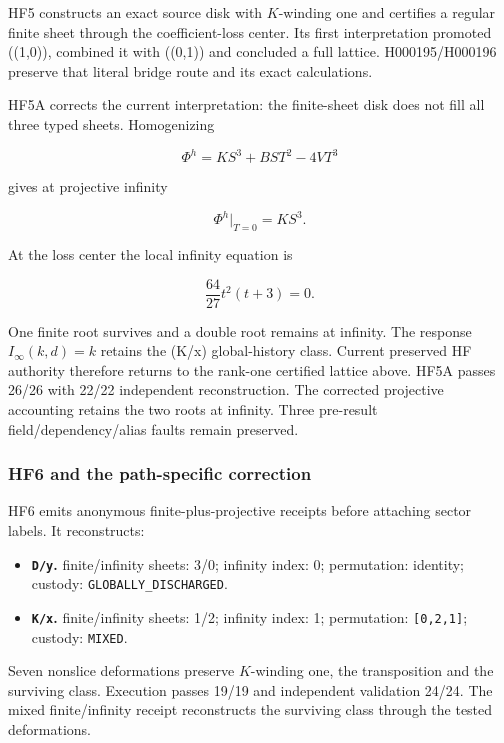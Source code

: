 HF5 constructs an exact source disk with \(K\)-winding one and certifies
a regular finite sheet through the coefficient-loss center. Its first
interpretation promoted ((1,0)), combined it with ((0,1)) and concluded
a full lattice. H000195/H000196 preserve that literal bridge route and
its exact calculations.

HF5A corrects the current interpretation: the finite-sheet disk does not
fill all three typed sheets. Homogenizing

\[
\Phi^h=KS^3+BST^2-4VT^3
\]

gives at projective infinity

\[
\Phi^h|_{T=0}=KS^3.
\]

At the loss center the local infinity equation is

\[
\frac{64}{27}t^2(t+3)=0.
\]

One finite root survives and a double root remains at infinity. The
response \(I_\infty(k,d)=k\) retains the (K/x) global-history class.
Current preserved HF authority therefore returns to the rank-one
certified lattice above. HF5A passes 26/26 with 22/22 independent
reconstruction. The corrected projective accounting retains the two roots at infinity. Three pre-result
field/dependency/alias faults remain preserved.

\subsubsection{HF6 and the path-specific
correction}\label{viii-ch11-hf6-and-the-path-specific-correction}

HF6 emits anonymous finite-plus-projective receipts before attaching
sector labels. It reconstructs:

\begin{itemize}
\tightlist
\item
  \textbf{\texttt{D/y}.} finite/infinity sheets: 3/0; infinity index: 0;
  permutation: identity; custody: \texttt{GLOBALLY\_DISCHARGED}.
\item
  \textbf{\texttt{K/x}.} finite/infinity sheets: 1/2; infinity index: 1;
  permutation: \texttt{{[}0,2,1{]}}; custody: \texttt{MIXED}.
\end{itemize}

Seven nonslice deformations preserve \(K\)-winding one, the
transposition and the surviving class. Execution passes 19/19 and
independent validation 24/24. The mixed finite/infinity receipt reconstructs the surviving class through the tested deformations.

